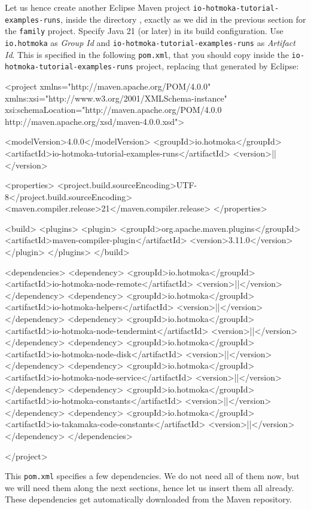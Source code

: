 Let us hence create another Eclipse Maven project
\texttt{io-hotmoka-tutorial-examples-runs}, inside
the directory \texttt{\hotmokaTutorialDir{}},
exactly as we did in the previous section for the \texttt{family} project.
Specify Java 21 (or later) in its build configuration.
Use \texttt{io.hotmoka} as \emph{Group Id} and
\texttt{io-hotmoka-tutorial-examples-runs} as \emph{Artifact Id}.
This is specified in the following \texttt{pom.xml}, that you should copy inside
the \texttt{io-hotmoka-tutorial-examples-runs} project, replacing that generated by Eclipse:
%
\begin{codebox}\begin{xmllst}
<project xmlns="http://maven.apache.org/POM/4.0.0"
  xmlns:xsi="http://www.w3.org/2001/XMLSchema-instance"
  xsi:schemaLocation="http://maven.apache.org/POM/4.0.0 http://maven.apache.org/xsd/maven-4.0.0.xsd">

  <modelVersion>4.0.0</modelVersion>
  <groupId>io.hotmoka</groupId>
  <artifactId>io-hotmoka-tutorial-examples-runs</artifactId>
  <version>|\hotmokaVersion{}|</version>

  <properties>
    <project.build.sourceEncoding>UTF-8</project.build.sourceEncoding>
    <maven.compiler.release>21</maven.compiler.release>
  </properties>

  <build>
    <plugins>
      <plugin>
        <groupId>org.apache.maven.plugins</groupId>
        <artifactId>maven-compiler-plugin</artifactId>
        <version>3.11.0</version>
      </plugin>
    </plugins>
  </build>

  <dependencies>
    <dependency>
      <groupId>io.hotmoka</groupId>
      <artifactId>io-hotmoka-node-remote</artifactId>
      <version>|\hotmokaVersion{}|</version>
    </dependency>
    <dependency>
      <groupId>io.hotmoka</groupId>
      <artifactId>io-hotmoka-helpers</artifactId>
      <version>|\hotmokaVersion{}|</version>
    </dependency>
    <dependency>
      <groupId>io.hotmoka</groupId>
      <artifactId>io-hotmoka-node-tendermint</artifactId>
      <version>|\hotmokaVersion{}|</version>
    </dependency>
    <dependency>
      <groupId>io.hotmoka</groupId>
      <artifactId>io-hotmoka-node-disk</artifactId>
      <version>|\hotmokaVersion{}|</version>
    </dependency>
    <dependency>
      <groupId>io.hotmoka</groupId>
      <artifactId>io-hotmoka-node-service</artifactId>
      <version>|\hotmokaVersion{}|</version>
    </dependency>
    <dependency>
      <groupId>io.hotmoka</groupId>
      <artifactId>io-hotmoka-constants</artifactId>
      <version>|\hotmokaVersion{}|</version>
    </dependency>
    <dependency>
      <groupId>io.hotmoka</groupId>
      <artifactId>io-takamaka-code-constants</artifactId>
      <version>|\takamakaVersion{}|</version>
    </dependency>
  </dependencies>

</project>
\end{xmllst}\end{codebox}
%
This \texttt{pom.xml} specifies a few dependencies. We do not need all of them now,
but we will need them along the next sections, hence let us insert them all already.
These dependencies get automatically downloaded from the Maven repository.

